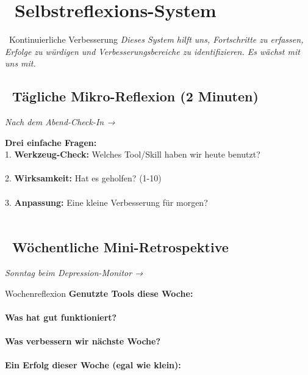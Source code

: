 \newpage
\section*{\textcolor{ctmmPurple}{\faChartLine~Selbstreflexions-System}}
\label{sec:feedback}

\begin{ctmmPurpleBox}{\faSync~Kontinuierliche Verbesserung}
\textit{Dieses System hilft uns, Fortschritte zu erfassen, Erfolge zu würdigen und Verbesserungsbereiche zu identifizieren. Es wächst mit uns mit.}
\end{ctmmPurpleBox}

\subsection*{\faCalendar~Tägliche Mikro-Reflexion (2 Minuten)}
\textit{Nach dem Abend-Check-In → }

\textbf{Drei einfache Fragen:}\\[0.3cm]
1. \textbf{Werkzeug-Check:} Welches Tool/Skill haben wir heute benutzt?\\
\\[0.3cm]

2. \textbf{Wirksamkeit:} Hat es geholfen? (1-10)\\
\\[0.3cm]

3. \textbf{Anpassung:} Eine kleine Verbesserung für morgen?\\
\\[0.5cm]

\subsection*{\faCalendar~Wöchentliche Mini-Retrospektive}
\textit{Sonntag beim Depression-Monitor → }

\begin{ctmmYellowBox}{Wochenreflexion}
\textbf{Genutzte Tools diese Woche:}\\
 \quad {} \quad {}\\[0.3cm]

\textbf{Was hat gut funktioniert?}\\
\\[0.3cm]

\textbf{Was verbessern wir nächste Woche?}\\
\\[0.3cm]

\textbf{Ein Erfolg dieser Woche (egal wie klein):}\\
\end{ctmmYellowBox}

